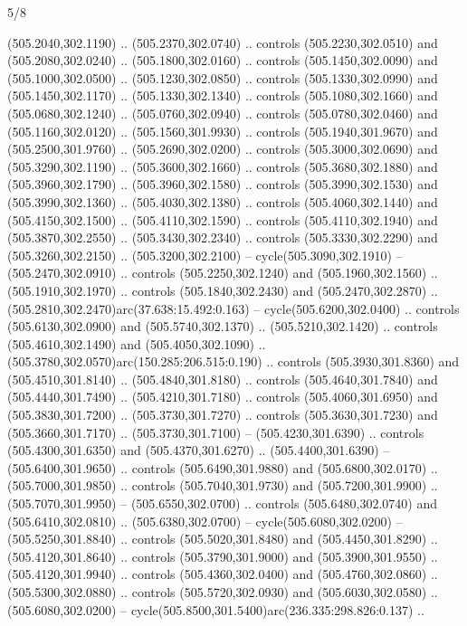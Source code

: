 \begin{flagdescription}{5/8}
\begin{scope}[xshift=0.5\flaglength,yshift=0.5\flagwidth,scale=\flagwidth/475.63]
\begin{scope}[y=0.8pt, x=0.8pt, yscale=-1, xscale=1,shift={(-450,-300)}]
\begin{scope}[cm={{1.0,0.0,0.0,1.0,(-0.0002,0.12556)}},cm={{1.0,0.0,0.0,1.0,(0.00179,0.0)}}]
\begin{scope}[cm={{1.11592,0.0,0.0,1.11592,(-106.89933,-41.77764)}}]
\begin{scope}[draw=black,fill=cfff]
\begin{scope}[fill=black]
  (505.2040,302.1190) .. (505.2370,302.0740) .. controls (505.2230,302.0510) and
  (505.2080,302.0240) .. (505.1800,302.0160) .. controls (505.1450,302.0090) and
  (505.1000,302.0500) .. (505.1230,302.0850) .. controls (505.1330,302.0990) and
  (505.1450,302.1170) .. (505.1330,302.1340) .. controls (505.1080,302.1660) and
  (505.0680,302.1240) .. (505.0760,302.0940) .. controls (505.0780,302.0460) and
  (505.1160,302.0120) .. (505.1560,301.9930) .. controls (505.1940,301.9670) and
  (505.2500,301.9760) .. (505.2690,302.0200) .. controls (505.3000,302.0690) and
  (505.3290,302.1190) .. (505.3600,302.1660) .. controls (505.3680,302.1880) and
  (505.3960,302.1790) .. (505.3960,302.1580) .. controls (505.3990,302.1530) and
  (505.3990,302.1360) .. (505.4030,302.1380) .. controls (505.4060,302.1440) and
  (505.4150,302.1500) .. (505.4110,302.1590) .. controls (505.4110,302.1940) and
  (505.3870,302.2550) .. (505.3430,302.2340) .. controls (505.3330,302.2290) and
  (505.3260,302.2150) .. (505.3200,302.2100) -- cycle(505.3090,302.1910) --
  (505.2470,302.0910) .. controls (505.2250,302.1240) and (505.1960,302.1560) ..
  (505.1910,302.1970) .. controls (505.1840,302.2430) and (505.2470,302.2870) ..
  (505.2810,302.2470)arc(37.638:15.492:0.163) -- cycle(505.6200,302.0400) ..
  controls (505.6130,302.0900) and (505.5740,302.1370) .. (505.5210,302.1420) ..
  controls (505.4610,302.1490) and (505.4050,302.1090) ..
  (505.3780,302.0570)arc(150.285:206.515:0.190) .. controls (505.3930,301.8360)
  and (505.4510,301.8140) .. (505.4840,301.8180) .. controls (505.4640,301.7840)
  and (505.4440,301.7490) .. (505.4210,301.7180) .. controls (505.4060,301.6950)
  and (505.3830,301.7200) .. (505.3730,301.7270) .. controls (505.3630,301.7230)
  and (505.3660,301.7170) .. (505.3730,301.7100) -- (505.4230,301.6390) ..
  controls (505.4300,301.6350) and (505.4370,301.6270) .. (505.4400,301.6390) --
  (505.6400,301.9650) .. controls (505.6490,301.9880) and (505.6800,302.0170) ..
  (505.7000,301.9850) .. controls (505.7040,301.9730) and (505.7200,301.9900) ..
  (505.7070,301.9950) -- (505.6550,302.0700) .. controls (505.6480,302.0740) and
  (505.6410,302.0810) .. (505.6380,302.0700) -- cycle(505.6080,302.0200) --
  (505.5250,301.8840) .. controls (505.5020,301.8480) and (505.4450,301.8290) ..
  (505.4120,301.8640) .. controls (505.3790,301.9000) and (505.3900,301.9550) ..
  (505.4120,301.9940) .. controls (505.4360,302.0400) and (505.4760,302.0860) ..
  (505.5300,302.0880) .. controls (505.5720,302.0930) and (505.6030,302.0580) ..
  (505.6080,302.0200) -- cycle(505.8500,301.5400)arc(236.335:298.826:0.137) ..

\end{scope}
\end{scope}
\end{scope}
\end{scope}
\end{scope}
\end{scope}
\end{flagdescription}
